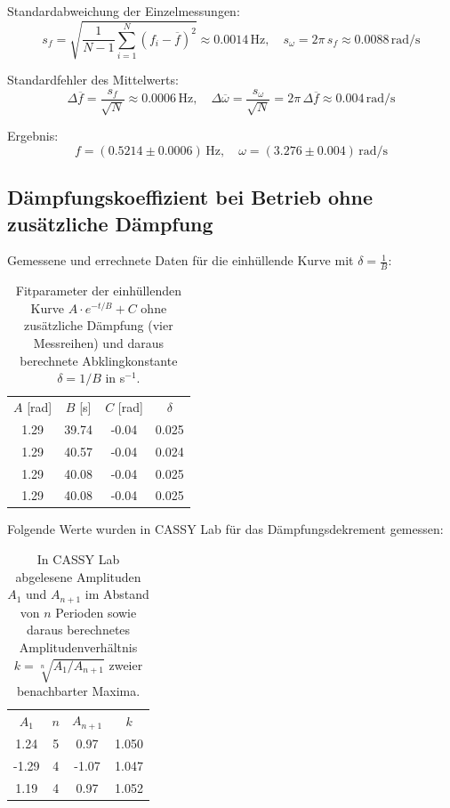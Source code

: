 \documentclass[
  headings=optiontotocandhead,
  twoside,
  openright,
  numbers=noenddot,
  toc=flat,
  11pt,
  parskip=full,
  listof=flat,
  bibliography=totoc,
  a4paper,
  DIV=14,
  BCOR=22mm,
  headheight=5mm,
  headinclude=true,
]{scrartcl}
\begin{document}
Standardabweichung der Einzelmessungen:
$$ s_f = \sqrt{\frac{1}{N-1}\sum_{i=1}^{N}\left(f_i - \overline{f}\right)^2} \approx 0.0014 \, \text{Hz}, \quad
   s_\omega = 2\pi \, s_f \approx 0.0088 \, \text{rad}/\text{s} $$

Standardfehler des Mittelwerts:
$$ \Delta\overline{f} = \frac{s_f}{\sqrt{N}} \approx 0.0006 \, \text{Hz}, \quad
   \Delta\overline{\omega} = \frac{s_\omega}{\sqrt{N}} = 2\pi\,\Delta\overline{f} \approx 0.004 \, \text{rad}/\text{s} $$

Ergebnis:
$$ f = (0.5214 \pm 0.0006) \, \text{Hz}, \quad \omega = (3.276 \pm 0.004) \, \text{rad}/\text{s} $$

\subsection{Dämpfungskoeffizient bei Betrieb ohne zusätzliche Dämpfung}

Gemessene und errechnete Daten für die einhüllende Kurve mit $\delta = \frac{1}{B}$:

\begin{table}[H]
  \centering
  \setlength{\tabcolsep}{10pt}
  \begin{tabular}{ |c|c|c|c| }
    \multicolumn{1}{c}{$A$ [rad]} & \multicolumn{1}{c}{$B$ [s]} & \multicolumn{1}{c}{$C$ [rad]} & \multicolumn{1}{c}{$\delta$} \\
    1.29 & 39.74 & -0.04 & 0.025 \\
    1.29 & 40.57 & -0.04 & 0.024 \\
    1.29 & 40.08 & -0.04 & 0.025 \\
    1.29 & 40.08 & -0.04 & 0.025 \\
  \end{tabular}
    \caption{Fitparameter der einhüllenden Kurve $A \cdot e^{-t/B} + C$ ohne zusätzliche Dämpfung (vier Messreihen) und daraus berechnete Abklingkonstante $\delta = 1/B$ in s$^{-1}$.}
  \label{tab:einhuellende_messung}
\end{table}

Folgende Werte wurden in CASSY Lab für das Dämpfungsdekrement gemessen:

\begin{table}[H]
  \centering
  \setlength{\tabcolsep}{10pt}
  \begin{tabular}{ |c|c|c|c| }
    \multicolumn{1}{c}{$A_1$} & \multicolumn{1}{c}{$n$} & \multicolumn{1}{c}{$A_{n+1}$} & \multicolumn{1}{c}{$k$} \\
    1.24 & 5 & 0.97 & 1.050 \\
    -1.29 & 4 & -1.07 & 1.047 \\
    1.19 & 4 & 0.97 & 1.052 \\
  \end{tabular}
    \caption{In CASSY Lab abgelesene Amplituden $A_1$ und $A_{n+1}$ im Abstand von $n$ Perioden sowie daraus berechnetes Amplitudenverhältnis $k = \sqrt[n]{A_1/A_{n+1}}$ zweier benachbarter Maxima.}
  \label{tab:daempfungsdekrement_messung}
\end{table}
\end{document}
